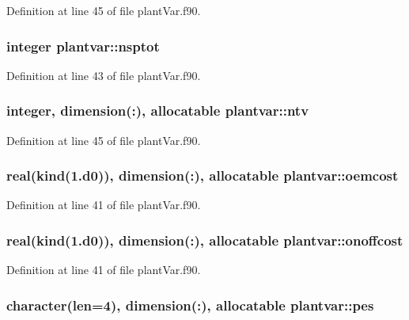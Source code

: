Definition at line 45 of file plant\-Var.\-f90.

\hypertarget{classplantvar_a1301bcb36aec6c118be8c084932de099}{
\subsubsection[{nsptot}]{\setlength{\rightskip}{0pt plus 5cm}integer plantvar\-::nsptot}}\label{classplantvar_a1301bcb36aec6c118be8c084932de099}


Definition at line 43 of file plant\-Var.\-f90.

\hypertarget{classplantvar_a019098844671b06b71ae0b76aa3d4fa8}{
\subsubsection[{ntv}]{\setlength{\rightskip}{0pt plus 5cm}integer, dimension(\-:), allocatable plantvar\-::ntv}}\label{classplantvar_a019098844671b06b71ae0b76aa3d4fa8}


Definition at line 45 of file plant\-Var.\-f90.

\hypertarget{classplantvar_a7d84f514ffc359590a9038d738c75705}{
\subsubsection[{oemcost}]{\setlength{\rightskip}{0pt plus 5cm}real(kind(1.d0)), dimension(\-:), allocatable plantvar\-::oemcost}}\label{classplantvar_a7d84f514ffc359590a9038d738c75705}


Definition at line 41 of file plant\-Var.\-f90.

\hypertarget{classplantvar_a2eeecb6eae117408ce2858d0aca03c7d}{
\subsubsection[{onoffcost}]{\setlength{\rightskip}{0pt plus 5cm}real(kind(1.d0)), dimension(\-:), allocatable plantvar\-::onoffcost}}\label{classplantvar_a2eeecb6eae117408ce2858d0aca03c7d}


Definition at line 41 of file plant\-Var.\-f90.

\hypertarget{classplantvar_a8b75644cc6f0b1728b0fdcd7c575c177}{
\subsubsection[{pes}]{\setlength{\rightskip}{0pt plus 5cm}character(len=4), dimension(\-:), allocatable plantvar\-::pes}}\label{classplantvar_a8b75644cc6f0b1728b0fdcd7c575c177}


